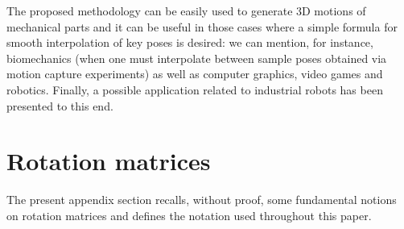 The proposed methodology can be easily used to generate 3D motions of mechanical parts and it can be useful in those cases where a simple formula for smooth interpolation of key poses is desired: we can mention, for instance, biomechanics (when one must interpolate between sample poses obtained via motion capture experiments) as well as computer graphics, video games and robotics. Finally, a possible application related to industrial robots has been presented to this end. 



\clearpage
\appendix

\section{Rotation matrices}
\label{app:RotatMatrix}
The present appendix section recalls, without proof, some fundamental notions on rotation matrices \cite{joe-angoli,joe-prj} and defines the notation used throughout this paper.

